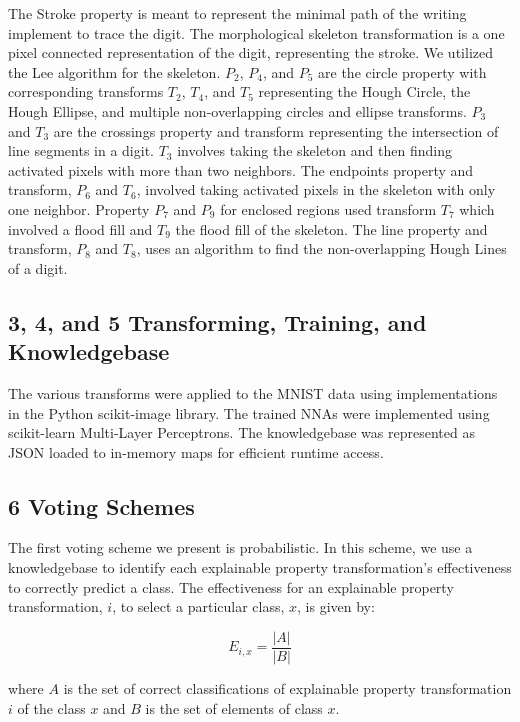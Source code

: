 \documentclass[conference]{IEEEtran}
\begin{document}
The Stroke property is meant to represent the minimal path of the writing implement to trace the digit.  The morphological skeleton transformation is a one pixel connected representation of the digit,  representing the stroke.  We utilized the Lee\cite{Lee1994} algorithm for the skeleton.
$P_2$, $P_4$, and $P_5$ are the circle property with corresponding transforms $T_2$, $T_4$, and $T_5$ representing the Hough Circle, the Hough Ellipse, and multiple non-overlapping circles and ellipse transforms.
$P_3$ and $T_3$ are the crossings property and transform representing the intersection of line segments in a digit.  $T_3$ involves taking the skeleton and then finding activated pixels with more than two neighbors.   The endpoints property and transform, $P_6$ and $T_6$, involved taking activated pixels in the skeleton with only one neighbor.
Property $P_7$ and $P_9$ for enclosed regions used transform $T_7$ which involved a flood fill and $T_9$ the flood fill of the skeleton.  The line property and transform, $P_8$ and $T_8$, uses an algorithm to find the non-overlapping Hough Lines of a digit.

\subsection{3, 4, and 5 Transforming, Training, and Knowledgebase}

The various transforms were applied to the MNIST data using implementations in the Python scikit-image library.  The trained NNAs were implemented using scikit-learn Multi-Layer Perceptrons.  The knowledgebase was represented as JSON loaded to in-memory maps for efficient runtime access.

\subsection{6 Voting Schemes}
\label{subsection:Voting}

The first voting scheme we present is probabilistic.  In this scheme, we use a knowledgebase to identify each explainable property transformation's effectiveness to correctly predict a class.   The effectiveness for an explainable property transformation, $i$, to select a particular class, $x$,  is given by:

\begin{equation}\label{effectiveness}
E_{i,x}  = \frac{|A|}{|B|}
\end{equation}

where $A$ is the set of correct classifications of explainable property transformation $i$ of the class $x$ and $B$ is the set of elements of class $x$. 
\end{document}

